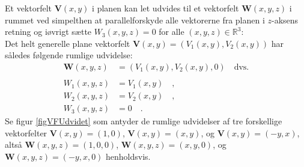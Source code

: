 \begin{aha}
Et vektorfelt $\mathbf{V}(x,y)$ i planen kan let udvides til et vektorfelt $\mathbf{W}(x,y,z)$ i rummet ved simpelthen at parallelforskyde alle vektorerne fra planen i  $z$-aksens retning og iøvrigt sætte
$W_{3}(x,y,z) = 0$ for alle $(x,y,z) \in \mathbb{R}^{3}$: \\

Det helt generelle plane vektorfelt $\mathbf{V}(x,y) = (V_{1}(x,y), V_{2}(x,y))$ har således følgende rumlige udvidelse:
\begin{equation}
\begin{aligned}
\mathbf{W}(x,y,z) &= (V_{1}(x,y), V_{2}(x,y), 0) \quad \textrm{dvs.} \\ \\
W_{1}(x,y,z) &= V_{1}(x,y) \quad ,\\
W_{2}(x,y,z) &= V_{2}(x,y) \quad ,\\
W_{3}(x,y,z) &= 0 \quad .
\end{aligned}
\end{equation}
Se figur \ref{figVFUdvidet} som antyder de rumlige udvidelser af tre forskellige  vektorfelter $\mathbf{V}(x,y) = (1,0)$, $\mathbf{V}(x,y) = (x,y)$, og $\mathbf{V}(x,y) = (-y, x)$,  altså $\mathbf{W}(x,y,z) = (1,0,0)$, $\mathbf{W}(x,y,z) = (x,y,0)$, og $\mathbf{W}(x,y,z) = (-y, x, 0)$ henholdsvis.
\end{aha}

